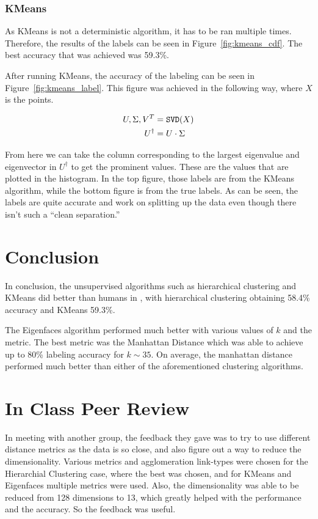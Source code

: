 \documentclass{article}
\begin{document}
\subsubsection*{KMeans}

As KMeans is not a deterministic algorithm, it has to be ran multiple times. Therefore, the results of the labels can be seen in Figure~\ref{fig:kmeans_cdf}. The best accuracy that was achieved was 59.3\%. 

After running KMeans, the accuracy of the labeling can be seen in Figure~\ref{fig:kmeans_label}. This figure was achieved in the following way, where $X$ is the points.

\begin{align*}
  U, \Sigma, V^{T} &= {\tt SVD}(X)\\
  U^{\dagger} &= U\cdot \Sigma
\end{align*}

From here we can take the column corresponding to the largest eigenvalue and eigenvector in $U^{\dagger}$ to get the prominent values. These are the values that are plotted in the histogram. In the top figure, those labels are from the KMeans algorithm, while the bottom figure is from the true labels. As can be seen, the labels are quite accurate and work on splitting up the data even though there isn't such a ``clean separation.''

\section*{Conclusion}

In conclusion, the unsupervised algorithms such as hierarchical clustering and KMeans did better than humans in \cite{MormonID}, with hierarchical clustering obtaining 58.4\% accuracy and KMeans 59.3\%. 

The Eigenfaces algorithm performed much better with various values of $k$ and the metric. The best metric was the Manhattan Distance which was able to achieve up to 80\% labeling accuracy for $k \sim 35$. On average, the manhattan distance performed much better than either of the aforementioned clustering algorithms. 

\section*{In Class Peer Review}

In meeting with another group, the feedback they gave was to try to use different distance metrics as the data is so close, and also figure out a way to reduce the dimensionality. Various metrics and agglomeration link-types were chosen for the Hierarchial Clustering case, where the best was chosen, and for KMeans and Eigenfaces multiple metrics were used. Also, the dimensionality was able to be reduced from 128 dimensions to 13, which greatly helped with the performance and the accuracy. So the feedback was useful.
\end{document}
